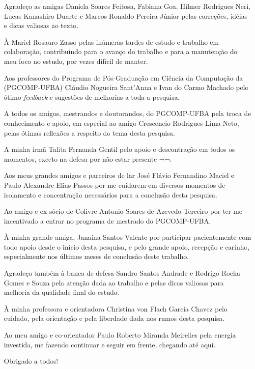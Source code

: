 Agradeço as amigas
Daniela Soares Feitosa,
Fabiana Goa,
Hilmer Rodrigues Neri,
Lucas Kanashiro Duarte e
Marcos Ronaldo Pereira Júnior
pelas correções, idéias e dicas valiosas ao texto.

À
Mariel Rosauro Zasso
pelas inúmeras tardes de estudo e trabalho em colaboração, contribuindo para o
avanço do trabalho e para a manutenção do meu foco no estudo, por vezes difícil
de manter.

Aos professores do Programa de Pós-Graduação em Ciência da Computação da (PGCOMP-UFBA)
Cláudio Nogueira Sant'Anna e
Ivan do Carmo Machado
pelo ótimo {\it feedback} e sugestões de melhorias a toda a pesquisa.

A todos os amigos, mestrandos e doutorandos, do PGCOMP-UFBA pela troca de
conhecimento e apoio, em especial ao amigo Crescencio Rodrigues Lima Neto,
pelas ótimas reflexões a respeito do tema desta pesquisa.

A minha irmã
Talita Fernanda Gentil
pelo apoio e descontração em todos os momentos, exceto na defesa por não estar
presente ¬¬.

Aos meus grandes amigos e parceiros de lar
José Flávio Fernandino Maciel e
Paulo Alexandre Elias Passos
por me cuidarem em diversos momentos de isolamento e concentração necessários para
a conclusão desta pesquisa.

Ao amigo e ex-sócio de Colivre
Antonio Soares de Azevedo Terceiro
por ter me incentivado a entrar no programa de mestrado do PGCOMP-UFBA.

À minha grande amiga,
Janaína Santos Valente
por participar pacientemente com todo apoio desde o início desta pesquisa, e
pelo grande apoio, recepção e carinho, especialmente nos últimos meses de
conclusão deste trabalho.

Agradeço também à banca de defesa
Sandro Santos Andrade e
Rodrigo Rocha Gomes e Souza
pela atenção dada ao trabalho e pelas dicas valiosas para melhoria da qualidade
final do estudo.

À minha professora e orientadora
Christina von Flach Garcia Chavez
pelo cuidado, pela orientação e pela liberdade dada nos rumos desta pesquisa.

Ao meu amigo e co-orientador
Paulo Roberto Miranda Meirelles
pela energia investida, me fazendo continuar e seguir em frente, chegando até
aqui.

Obrigado a todos!
